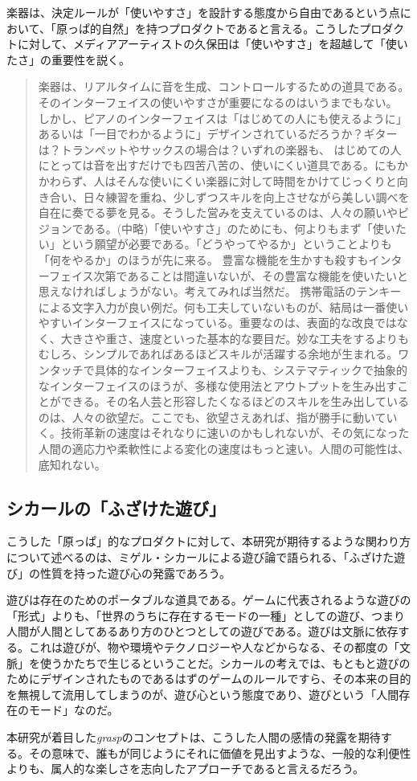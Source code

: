 楽器は、決定ルールが「使いやすさ」を設計する態度から自由であるという点において、「原っぱ的自然」を持つプロダクトであると言える。こうしたプロダクトに対して、メディアアーティストの久保田は「使いやすさ」を超越して「使いたさ」の重要性を説く。

\begin{quote}
  楽器は、リアルタイムに音を生成、コントロールするための道具である。そのインターフェイスの使いやすさが重要になるのはいうまでもない。 しかし、ピアノのインターフェイスは「はじめての人にも使えるように」あるいは「一目でわかるように」デザインされているだろうか？ギターは？トランペットやサックスの場合は？いずれの楽器も、 はじめての人にとっては音を出すだけでも四苦八苦の、使いにくい道具である。にもかかわらず、人はそんな使いにくい楽器に対して時間をかけてじっくりと向き合い、日々練習を重ね、少しずつスキルを向上させながら美しい調べを自在に奏でる夢を見る。そうした営みを支えているのは、人々の願いやビジョンである。(中略)「使いやすさ」のためにも、何よりもまず「使いたい」という願望が必要である。「どうやってやるか」ということよりも「何をやるか」のほうが先に来る。 豊富な機能を生かすも殺すもインターフェイス次第であることは間違いないが、その豊富な機能を使いたいと思えなければしょうがない。考えてみれば当然だ。 携帯電話のテンキーによる文字入力が良い例だ。何も工夫していないものが、結局は一番使いやすいインターフェイスになっている。重要なのは、表面的な改良ではなく、大きさや重さ、速度といった基本的な要目だ。妙な工夫をするよりもむしろ、シンプルであればあるほどスキルが活躍する余地が生まれる。ワンタッチで具体的なインターフェイスよりも、システマティックで抽象的なインターフェイスのほうが、多様な使用法とアウトプットを生み出すことができる。その名人芸と形容したくなるほどのスキルを生み出しているのは、人々の欲望だ。ここでも、欲望さえあれば、指が勝手に動いていく。技術革新の速度はそれなりに速いのかもしれないが、その気になった人間の適応力や柔軟性による変化の速度はもっと速い。人間の可能性は、底知れない。
\end{quote}

\subsection{シカールの「ふざけた遊び」}
こうした「原っぱ」的なプロダクトに対して、本研究が期待するような関わり方について述べるのは、ミゲル・シカールによる遊び論で語られる、「ふざけた遊び」の性質を持った遊び心の発露であろう。

遊びは存在のためのポータブルな道具である。ゲームに代表されるような遊びの「形式」よりも、「世界のうちに存在するモードの一種」としての遊び、つまり人間が人間としてあるあり方のひとつとしての遊びである。遊びは文脈に依存する。これは遊びが、物や環境やテクノロジーや人などからなる、その都度の「文脈」を使うかたちで生じるということだ。シカールの考えでは、もともと遊びのためにデザインされたものであるはずのゲームのルールですら、その本来の目的を無視して流用してしまうのが、遊び心という態度であり、遊びという「人間存在のモード」なのだ。

本研究が着目した\textit{grasp}のコンセプトは、こうした人間の感情の発露を期待する。その意味で、誰もが同じようにそれに価値を見出すような、一般的な利便性よりも、属人的な楽しさを志向したアプローチであると言えるだろう。